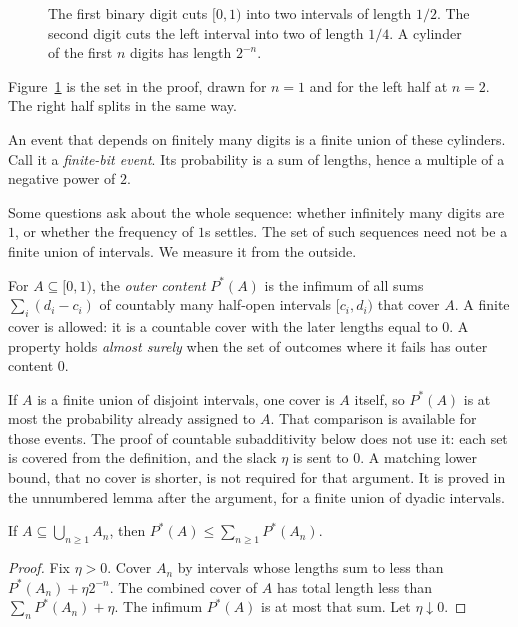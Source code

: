 \begin{figure}[ht]
\centering
{}
\caption{The first binary digit cuts $[0,1)$ into two intervals of length $1/2$. The second digit cuts the left interval into two of length $1/4$. A cylinder of the first $n$ digits has length $2^{-n}$.}
\label{fig:digits}
\end{figure}

Figure~\ref{fig:digits} is the set in the proof, drawn for $n=1$ and for the left half at $n=2$. The right half splits in the same way.

An event that depends on finitely many digits is a finite union of these cylinders. Call it a \emph{finite-bit event}. Its probability is a sum of lengths, hence a multiple of a negative power of $2$.

Some questions ask about the whole sequence: whether infinitely many digits are $1$, or whether the frequency of $1$s settles. The set of such sequences need not be a finite union of intervals. We measure it from the outside.

\begin{definition}\label{def:outer}
For $A\subseteq[0,1)$, the \emph{outer content} $P^*(A)$ is the infimum of all sums $\sum_i(d_i-c_i)$ of countably many half-open intervals $[c_i,d_i)$ that cover $A$. A finite cover is allowed: it is a countable cover with the later lengths equal to $0$. A property holds \emph{almost surely} when the set of outcomes where it fails has outer content $0$.
\end{definition}

If $A$ is a finite union of disjoint intervals, one cover is $A$ itself, so $P^*(A)$ is at most the probability already assigned to $A$. That comparison is available for those events. The proof of countable subadditivity below does not use it: each set is covered from the definition, and the slack $\eta$ is sent to $0$. A matching lower bound, that no cover is shorter, is not required for that argument. It is proved in the unnumbered lemma after the argument, for a finite union of dyadic intervals.

\begin{proposition}\label{prop:subadd}
If $A\subseteq\bigcup_{n\ge1}A_n$, then $P^*(A)\le\sum_{n\ge1}P^*(A_n)$.
\end{proposition}
\begin{proof}
Fix $\eta>0$. Cover $A_n$ by intervals whose lengths sum to less than $P^*(A_n)+\eta 2^{-n}$. The combined cover of $A$ has total length less than $\sum_n P^*(A_n)+\eta$. The infimum $P^*(A)$ is at most that sum. Let $\eta\downarrow0$.
\end{proof}

